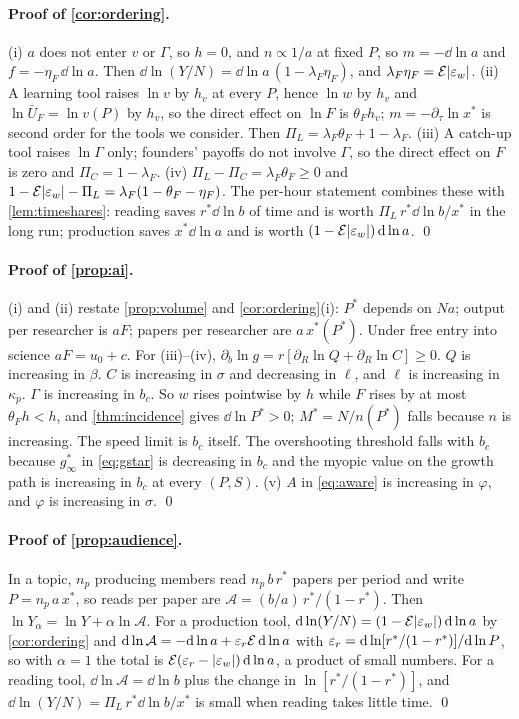 \paragraph{Proof of \cref{cor:ordering}.} (i) $a$ does not enter $v$ or $\Gamma$,
so $h=0$, and $n\propto1/a$ at fixed $P$, so $m=-\dd\ln a$ and $f=-\eta_F\,\dd\ln a$.
Then $\dd\ln(Y/N)=\dd\ln a\,(1-\lambda_F\eta_F)$, and $\lambda_F\eta_F=\mathcal E|\varepsilon_w|$.
(ii) A learning tool raises $\ln v$ by $h_v$ at every $P$, hence $\ln w$ by $h_v$
and $\ln\bar U_F=\ln v(P)$ by $h_v$, so the direct effect on $\ln F$ is
$\theta_Fh_v$; $m=-\partial_\tau\ln x^*$ is second order for the tools we
consider. Then $\Pi_L=\lambda_F\theta_F+1-\lambda_F$. (iii) A catch-up tool raises
$\ln\Gamma$ only; founders' payoffs do not involve $\Gamma$, so the direct effect on
$F$ is zero and $\Pi_C=1-\lambda_F$. (iv) $\Pi_L-\Pi_C=\lambda_F\theta_F\ge0$ and
$1-\mathcal E|\varepsilon_w|-\Pi_L=\lambda_F(1-\theta_F-\eta_F)$. The per-hour statement combines
these with \cref{lem:timeshares}: reading saves $r^*\dd\ln b$ of time and is worth
$\Pi_L\,r^*\dd\ln b/x^*$ in the long run; production saves $x^*\dd\ln a$ and is
worth $(1-\mathcal E|\varepsilon_w|)\,\mathrm{d}\ln a$. \qed

\paragraph{Proof of \cref{prop:ai}.} (i) and (ii) restate \cref{prop:volume} and
\cref{cor:ordering}(i): $P^*$ depends on $Na$; output per researcher is $aF$;
papers per researcher are $a\,x^*(P^*)$. Under free entry into science
$aF=u_0+c$. For (iii)--(iv), $\partial_b\ln g=r[\partial_R\ln Q+\partial_R\ln C]\ge0$.
$Q$ is increasing in $\beta$. $C$ is increasing in $\sigma$ and decreasing in $\ell$,
and $\ell$ is increasing in $\kappa_p$. $\Gamma$ is increasing in $b_c$. So $w$ rises
pointwise by $h$ while $F$ rises by at most $\theta_Fh<h$, and \cref{thm:incidence}
gives $\dd\ln P^*>0$; $M^*=N/n(P^*)$ falls because $n$ is increasing. The speed
limit is $b_c$ itself. The overshooting threshold falls with $b_c$ because
$g^*_\infty$ in \eqref{eq:gstar} is decreasing in $b_c$ and the myopic value on the
growth path is increasing in $b_c$ at every $(P,S)$. (v) $A$ in \eqref{eq:aware}
is increasing in $\varphi$, and $\varphi$ is increasing in $\sigma$. \qed

\paragraph{Proof of \cref{prop:audience}.} In a topic, $n_p$ producing members
read $n_p\,b\,r^*$ papers per period and write $P=n_p\,a\,x^*$, so reads per
paper are $\mathcal A=(b/a)\,r^*/(1-r^*)$. Then
$\ln Y_\alpha=\ln Y+\alpha\ln\mathcal A$. For a production tool,
$\mathrm{d}\ln(Y/N)=(1-\mathcal E|\varepsilon_w|)\,\mathrm{d}\ln a$ by \cref{cor:ordering} and
$\mathrm{d}\ln\mathcal A=-\mathrm{d}\ln a+\varepsilon_r\mathcal E\,\mathrm{d}\ln a$ with
$\varepsilon_r=\mathrm{d}\ln[r^*/(1-r^*)]/\mathrm{d}\ln P$, so with $\alpha=1$ the total is
$\mathcal E(\varepsilon_r-|\varepsilon_w|)\,\mathrm{d}\ln a$, a product of small numbers. For a reading
tool, $\dd\ln\mathcal A=\dd\ln b$ plus the change in $\ln[r^*/(1-r^*)]$, and
$\dd\ln(Y/N)=\Pi_L\,r^*\dd\ln b/x^*$ is small when reading takes little time. \qed

